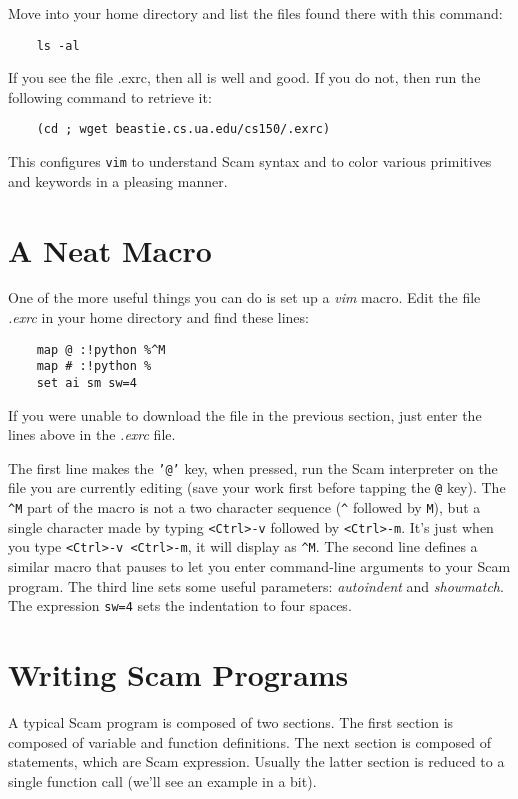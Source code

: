 Move into your home directory and list the files found there
with this command:

\begin{verbatim}
    ls -al
\end{verbatim}

If you see the file .exrc, then all is well and good.
If you do not, then run the following command to
retrieve it:

\begin{verbatim}
    (cd ; wget beastie.cs.ua.edu/cs150/.exrc)
\end{verbatim}

This configures {\tt vim} to understand Scam syntax and to color
various primitives and keywords in a pleasing manner.

\section{A Neat Macro}

One of the more useful things you can do is set up a {\it vim} 
macro. Edit the file {\it .exrc} in your home directory and
find these lines:

\begin{verbatim}
    map @ :!python %^M
    map # :!python % 
    set ai sm sw=4
\end{verbatim}

If you were unable to download the file in the previous section,
just enter the lines above in the {\it .exrc} file.

The first line makes the {\tt '@'} key,
when pressed,
run the Scam interpreter on
the file you are currently editing (save your work first before
tapping the {\tt @} key). The \verb+^M+ part of the macro
is not a two character sequence (\verb+^+ followed by {\tt M}),
but a single character made by typing \verb+<Ctrl>-v+ followed by
\verb+<Ctrl>-m+.
It's just when you type \verb+<Ctrl>-v <Ctrl>-m+, it will display as
\verb+^M+.
The second line defines a similar macro that pauses to let you enter
command-line arguments to your Scam program.
The third line sets some useful parameters:
{\it autoindent} and {\it showmatch}.
The expression {\tt sw=4} sets the indentation to four spaces.

\section{Writing Scam Programs}

A typical Scam program is composed of two sections. The first
section is composed of variable and function definitions.
The next section is composed of statements, which are Scam
expression. Usually the latter section is reduced to
a single function call (we'll see an example in a bit).

